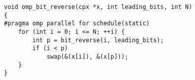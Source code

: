 \lstset{language=C++}
\begin{lstlisting}
void omp_bit_reverse(cpx *x, int leading_bits, int N)
{
#pragma omp parallel for schedule(static)
    for (int i = 0; i <= N; ++i) {
        int p = bit_reverse(i, leading_bits);
        if (i < p)
            swap(&(x[i]), &(x[p]));
    }
}
\end{lstlisting}